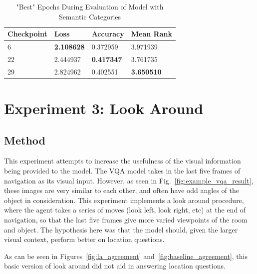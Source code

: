 \begin{table}[H]
\centering
\caption{"Best" Epochs During Evaluation of Model with Semantic Categories}
\begin{tabular}{l | l | l | l}
Checkpoint & Loss & Accuracy & Mean Rank \\
\hline
6 & \textbf{2.108628} & 0.372959 & 3.971939 \\
22 & 2.444937 & \textbf{0.417347} & 3.761735 \\
29 & 2.824962 & 0.402551 & \textbf{3.650510} 
\end{tabular}
\label{tab:best_category}
\end{table}

\section{Experiment 3: Look Around}
\label{sec:exp_3}
\subsection{Method}
This experiment attempts to increase the usefulness of the visual information being provided to the model. The VQA model takes in the last five frames of navigation as its visual input. However, as seen in Fig.~\ref{fig:example_vqa_result}, these images are very similar to each other, and often have odd angles of the object in consideration. This experiment implements a look around procedure, where the agent takes a series of moves (look left, look right, etc) at the end of navigation, so that the last five frames give more varied viewpoints of the room and object. The hypothesis here was that the model should, given the larger visual context, perform better on location questions. \newline
{}

As can be seen in Figures~\ref{fig:la_agreement} and~\ref{fig:baseline_agreement}, this basic version of look around did not aid in answering location questions. 

